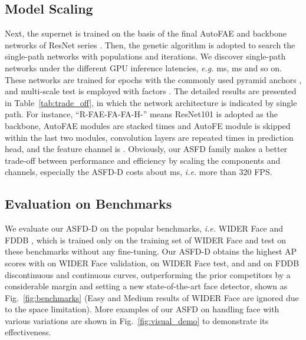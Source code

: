 \documentclass[sigconf]{acmart}
\begin{document}
\subsection{Model Scaling}
Next, the supernet is trained on the basis of the final AutoFAE and backbone networks of ResNet series \cite{he2016resnet}. Then, the genetic algorithm is adopted to search the single-path networks with  populations and  iterations. We discover  single-path networks under the different GPU inference latencies, \textit{e.g.} ms, ms and so on. These networks are trained for  epochs with the commonly used pyramid anchors \cite{tang2018pyramidbox}, and multi-scale test is employed with factors . The detailed results are presented in Table~\ref{tab:trade_off}, in which the network architecture is indicated by single path. For instance, ``R-FAE-FA-FA-H-'' means ResNet101 is adopted as the backbone, AutoFAE modules are stacked  times and AutoFE module is skipped within the last two modules, convolution layers are repeated  times in prediction head, and the feature channel is . Obviously, our ASFD family makes a better trade-off between performance and efficiency by scaling the components and channels, especially the ASFD-D costs about  ms, \textit{i.e.} more than 320 FPS.


\subsection{Evaluation on Benchmarks}
We evaluate our ASFD-D on the popular benchmarks, \textit{i.e.} WIDER Face \cite{yang2016wider} and FDDB \cite{jain2010fddb}, which is trained only on the training set of WIDER Face and test on these benchmarks without any fine-tuning. 
Our ASFD-D obtains the highest AP scores with  on WIDER Face validation,  on WIDER Face test, and  and  on FDDB discontinuous and continuous curves, outperforming the prior competitors by a considerable margin and setting a new state-of-the-art face detector, shown as Fig.~\ref{fig:benchmarks} (Easy and Medium results of WIDER Face are ignored due to the space limitation). More examples of our ASFD on handling face with various variations are shown in Fig.~\ref{fig:visual_demo} to demonstrate its effectiveness.
\end{document}
